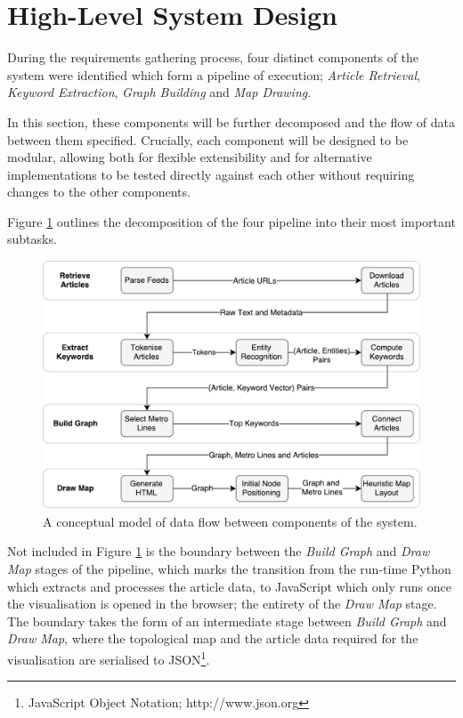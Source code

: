 \section{High-Level System Design}

During the requirements gathering process, four distinct components of the system were identified which form a pipeline of execution; \textit{Article Retrieval}, \textit{Keyword Extraction}, \textit{Graph Building} and \textit{Map Drawing}.

In this section, these components will be further decomposed and the flow of data between them specified. Crucially, each component will be designed to be modular, allowing both for flexible extensibility and for alternative implementations to be tested directly against each other without requiring changes to the other components.

Figure \ref{fig:dfp} outlines the decomposition of the four pipeline into their most important subtasks.

\begin{figure}[htbp!]
	\centering
	\includegraphics[width=\textwidth]{img/design/DataFlow.pdf}
	\caption{A conceptual model of data flow between components of the system.}
	\label{fig:dfp}
\end{figure}

Not included in Figure \ref{fig:dfp} is the boundary between the \textit{Build Graph} and \textit{Draw Map} stages of the pipeline, which marks the transition from the run-time Python which extracts and processes the article data, to JavaScript which only runs once the visualisation is opened in the browser; the entirety of the  \textit{Draw Map} stage. The boundary takes the form of an intermediate stage between \textit{Build Graph} and \textit{Draw Map}, where the topological map and the article data required for the visualisation are serialised to JSON\footnote{JavaScript Object Notation; http://www.json.org}.



